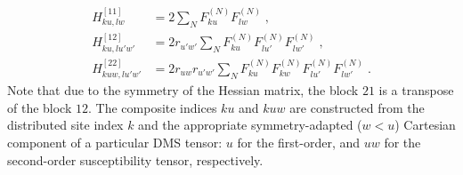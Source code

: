 \documentclass[aip,amsmath,amssymb,reprint,floatfix]{revtex4-1}
\begin{document}
%
\begin{subequations}
 \begin{align}
  H^{[11]}_{ku,lw} &= 2\sum_N F^{(N)}_{ku} F^{(N)}_{lw} \;,\\
  H^{[12]}_{ku,lu'w'} &= 2r_{u'w'} \sum_N F^{(N)}_{ku} F^{(N)}_{lu'} F^{(N)}_{lw'}  \;,\\
  H^{[22]}_{kuw,lu'w'} &= 2r_{uw} r_{u'w'} \sum_N F^{(N)}_{ku} F^{(N)}_{kw} F^{(N)}_{lu'} F^{(N)}_{lw'} \;.
 \end{align}
\end{subequations}
%
Note that due to the symmetry of the Hessian matrix, the block $21$
is a transpose of the block $12$. 
The composite indices $ku$ and $kuw$ are constructed from the distributed site index $k$
and the appropriate symmetry\hyp{}adapted ($w<u$) Cartesian component 
of a particular DMS tensor: $u$ for the first\hyp{}order,
and $uw$ for the second\hyp{}order susceptibility tensor, respectively.


\end{document}
